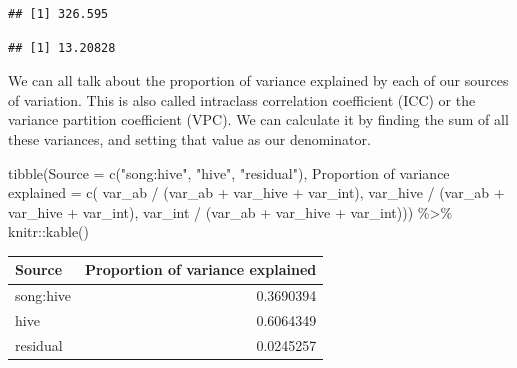 \documentclass[
  openany]{book}
\newenvironment{Shaded}{\begin{snugshade}}{\end{snugshade}}
\newcommand{\AttributeTok}[1]{\textcolor[rgb]{0.77,0.63,0.00}{#1}}
\newcommand{\CommentTok}[1]{\textcolor[rgb]{0.56,0.35,0.01}{\textit{#1}}}
\newcommand{\DecValTok}[1]{\textcolor[rgb]{0.00,0.00,0.81}{#1}}
\newcommand{\FunctionTok}[1]{\textcolor[rgb]{0.00,0.00,0.00}{#1}}
\newcommand{\NormalTok}[1]{#1}
\newcommand{\OtherTok}[1]{\textcolor[rgb]{0.56,0.35,0.01}{#1}}
\newcommand{\SpecialCharTok}[1]{\textcolor[rgb]{0.00,0.00,0.00}{#1}}
\newcommand{\StringTok}[1]{\textcolor[rgb]{0.31,0.60,0.02}{#1}}
\begin{document}
\begin{verbatim}
## [1] 326.595
\end{verbatim}

\begin{Shaded}
\end{Shaded}

\begin{verbatim}
## [1] 13.20828
\end{verbatim}

We can all talk about the proportion of variance explained by each of our sources of variation. This is also called intraclass correlation coefficient (ICC) or the variance partition coefficient (VPC). We can calculate it by finding the sum of all these variances, and setting that value as our denominator.

\begin{Shaded}
\begin{Highlighting}[]
\FunctionTok{tibble}\NormalTok{(}\AttributeTok{Source =} \FunctionTok{c}\NormalTok{(}\StringTok{"song:hive"}\NormalTok{, }\StringTok{"hive"}\NormalTok{, }\StringTok{"residual"}\NormalTok{),}
  \StringTok{\textasciigrave{}}\AttributeTok{Proportion of variance explained}\StringTok{\textasciigrave{}} \OtherTok{=} \FunctionTok{c}\NormalTok{(}
\NormalTok{    var\_ab }\SpecialCharTok{/}\NormalTok{ (var\_ab }\SpecialCharTok{+}\NormalTok{ var\_hive }\SpecialCharTok{+}\NormalTok{ var\_int),}
\NormalTok{    var\_hive }\SpecialCharTok{/}\NormalTok{ (var\_ab }\SpecialCharTok{+}\NormalTok{ var\_hive }\SpecialCharTok{+}\NormalTok{ var\_int),}
\NormalTok{    var\_int }\SpecialCharTok{/}\NormalTok{ (var\_ab }\SpecialCharTok{+}\NormalTok{ var\_hive }\SpecialCharTok{+}\NormalTok{ var\_int))) }\SpecialCharTok{\%\textgreater{}\%} 
\NormalTok{  knitr}\SpecialCharTok{::}\FunctionTok{kable}\NormalTok{()}
\end{Highlighting}
\end{Shaded}

\begin{tabular}{l|r}
\hline
Source & Proportion of variance explained\\
\hline
song:hive & 0.3690394\\
\hline
hive & 0.6064349\\
\hline
residual & 0.0245257\\
\hline
\end{tabular}
\end{document}
